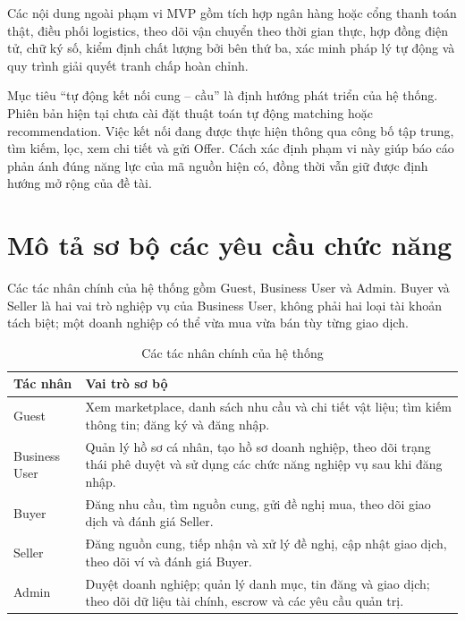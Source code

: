 \documentclass[12pt,a4paper,oneside]{report}
\begin{document}
Các nội dung ngoài phạm vi MVP gồm tích hợp ngân hàng hoặc cổng thanh toán thật,
điều phối logistics, theo dõi vận chuyển theo thời gian thực, hợp đồng điện tử,
chữ ký số, kiểm định chất lượng bởi bên thứ ba, xác minh pháp lý tự động và quy
trình giải quyết tranh chấp hoàn chỉnh.

Mục tiêu ``tự động kết nối cung -- cầu'' là định hướng phát triển của hệ thống.
Phiên bản hiện tại chưa cài đặt thuật toán tự động matching hoặc recommendation.
Việc kết nối đang được thực hiện thông qua công bố tập trung, tìm kiếm, lọc, xem
chi tiết và gửi Offer. Cách xác định phạm vi này giúp báo cáo phản ánh đúng năng
lực của mã nguồn hiện có, đồng thời vẫn giữ được định hướng mở rộng của đề tài.

\section{Mô tả sơ bộ các yêu cầu chức năng}
\label{sec:yeu-cau-chuc-nang-so-bo}

Các tác nhân chính của hệ thống gồm Guest, Business User và Admin. Buyer và
Seller là hai vai trò nghiệp vụ của Business User, không phải hai loại tài khoản
tách biệt; một doanh nghiệp có thể vừa mua vừa bán tùy từng giao dịch.

\begin{table}[htbp]
  \centering
  \caption{Các tác nhân chính của hệ thống}
  \label{tab:tac-nhan-chinh}
  \begin{tabularx}{\textwidth}{p{3.0cm}Y}
    \toprule
    \textbf{Tác nhân} & \textbf{Vai trò sơ bộ} \\
    \midrule
    Guest &
    Xem marketplace, danh sách nhu cầu và chi tiết vật liệu; tìm kiếm thông tin;
    đăng ký và đăng nhập. \\

    Business User &
    Quản lý hồ sơ cá nhân, tạo hồ sơ doanh nghiệp, theo dõi trạng thái phê duyệt
    và sử dụng các chức năng nghiệp vụ sau khi đăng nhập. \\

    Buyer &
    Đăng nhu cầu, tìm nguồn cung, gửi đề nghị mua, theo dõi giao dịch và đánh giá
    Seller. \\

    Seller &
    Đăng nguồn cung, tiếp nhận và xử lý đề nghị, cập nhật giao dịch, theo dõi ví
    và đánh giá Buyer. \\

    Admin &
    Duyệt doanh nghiệp; quản lý danh mục, tin đăng và giao dịch; theo dõi dữ liệu
    tài chính, escrow và các yêu cầu quản trị. \\
    \bottomrule
  \end{tabularx}
\end{table}
\end{document}
